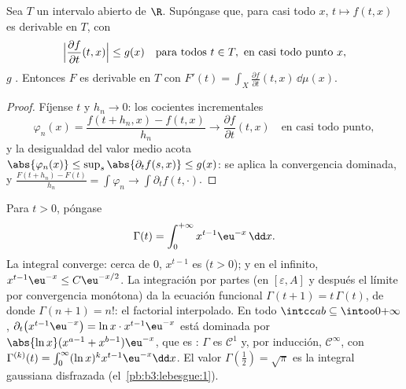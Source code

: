 \begin{theorem}
\label{thm:b3:lebesgue:paramdiff}
Sea $T$ un intervalo abierto de $\R$. Supóngase que, para casi todo $x$,
$t \mapsto f(t,x)$ es derivable en $T$, con
\[
\Bigl|\frac{\partial f}{\partial t}(t, x)\Bigr| \leq g(x)
\quad \text{para todos } t \in T,\ \text{en casi todo punto } x,
\]
$g$ . Entonces $F$ es derivable
en $T$ con $F'(t)
= \int_X \frac{\partial f}{\partial t}(t, x)\,\dd\mu(x)$.
\end{theorem}

\begin{proof}
Fíjense $t$ y $h_n \to 0$: los cocientes incrementales
\[
\varphi_n(x) = \frac{f(t + h_n, x) - f(t, x)}{h_n}
\longrightarrow \frac{\partial f}{\partial t}(t,x)
\quad\text{en casi todo punto},
\]
y la desigualdad del valor medio acota $\abs{\varphi_n(x)} \leq
\sup_{s}\abs{\partial_tf(s,x)} \leq g(x)$: se aplica la convergencia
dominada, y
$\frac{F(t + h_n) - F(t)}{h_n} = \int\varphi_n \to
\int\partial_t f(t, \cdot)$.
\end{proof}

\begin{example}\label{ex:b3:lebesgue:gamma}
Para $t > 0$, póngase
\[
\Gamma(t) = \int_0^{+\infty} x^{t-1}\eu^{-x}\,\dd x .
\]
La integral converge: cerca de $0$, $x^{t-1}$ es
 ($t >
0$); y en el infinito, $x^{t-1}\eu^{-x} \leq C\eu^{-x/2}$. La
integración por partes (en $[\varepsilon, A]$ y después el límite por
convergencia monótona) da la ecuación funcional $\Gamma(t + 1) =
t\,\Gamma(t)$, de donde $\Gamma(n+1) = n!$: el factorial interpolado. En
todo $\intcc ab \subseteq \intoo0{+\infty}$,
$\partial_t\bigl(x^{t-1}\eu^{-x}\bigr) = \ln
x\cdot x^{t-1}\eu^{-x}$ está dominada por $\abs{\ln x}(x^{a-1} +
x^{b-1})\eu^{-x}$, que es :
$\Gamma$ es $\mathcal C^1$ y, por inducción, $\mathcal C^\infty$, con
$\Gamma^{(k)}(t) =
\int_0^\infty(\ln x)^kx^{t-1}\eu^{-x}\dd x$. El valor
$\Gamma(\frac12) = \sqrt\pi$ es la integral gaussiana disfrazada
(el~\cref{pb:b3:lebesgue:1}).
\end{example}

